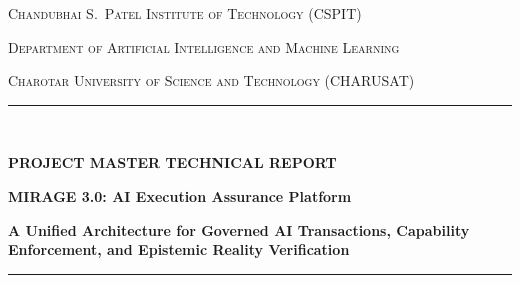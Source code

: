 \documentclass[11pt,a4paper]{article}
\begin{document}


\begin{titlepage}
\thispagestyle{empty}
\centering
\vspace*{0.2cm}
{\Large\scshape Chandubhai S.\ Patel Institute of Technology (CSPIT)\par}
\vspace{0.15cm}
{\large\scshape Department of Artificial Intelligence and Machine Learning\par}
\vspace{0.15cm}
{\normalsize\scshape Charotar University of Science and Technology (CHARUSAT)\par}
\vspace{0.6cm}

{\color{primarynavy}\rule{\linewidth}{1.5pt}}\\[0.4cm]
{\sffamily\huge\bfseries\color{primarynavy} PROJECT MASTER TECHNICAL REPORT\par}
\vspace{0.3cm}
{\sffamily\Large\bfseries\color{accentteal} MIRAGE 3.0: AI Execution Assurance Platform\par}
\vspace{0.2cm}
{\normalsize\color{darkslate}\textbf{A Unified Architecture for Governed AI Transactions, Capability Enforcement, and Epistemic Reality Verification}\par}
\vspace{0.3cm}
{\color{primarynavy}\rule{\linewidth}{1.5pt}}\\[0.5cm]



\end{titlepage}
\end{document}
